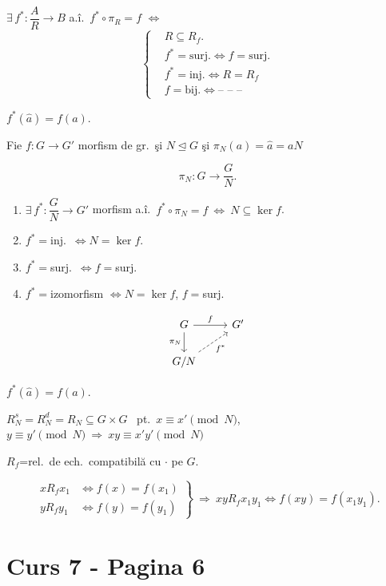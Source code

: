 \bigskip
\noindent $\exists\,f^*: \dfrac{A}{R} \to B$ a.î.\ $f^*\circ\pi_R = f$ $\Leftrightarrow$
\[
\left\{\begin{aligned}
&R\subseteq R_f.\\
&f^*=\text{surj.} \Leftrightarrow f=\text{surj.}\\
&f^*=\text{inj.} \Leftrightarrow R=R_f\\
&f=\text{bij.} \Leftrightarrow \text{-- -- --}
\end{aligned}\right.
\]

\noindent $f^*(\hat a) = f(a)$.

\bigskip
\noindent Fie $f:G\to G'$ morfism de gr.\ şi $N\trianglelefteq G$ şi $\pi_N(a) = \hat a = aN$

\[
\pi_N: G \to \dfrac{G}{N}.
\]

\begin{enumerate}
\item[(1)] $\exists\,f^*: \dfrac{G}{N}\to G'$ morfism a.î.\ $f^*\circ\pi_N = f \ \Leftrightarrow \ N\subseteq\ker f$.
\item[(2)] $f^*=$inj.\ $\Leftrightarrow N=\ker f$.
\item[(3)] $f^*=$surj.\ $\Leftrightarrow f=$surj.
\item[(4)] $f^*=$izomorfism $\Leftrightarrow N=\ker f$, $f=$surj.
\end{enumerate}

\[
\begin{tikzcd}
G \arrow[r,"f"] \arrow[d,"\pi_N"'] & G' \\
G/N \arrow[ur, dashed,"f^*"'] &
\end{tikzcd}
\]

\noindent $f^*(\hat a) = f(a)$.

\bigskip
\noindent $R_N^s = R_N^d = R_N \subseteq G\times G$ \ pt.\ $x\equiv x' \pmod N$, $y\equiv y' \pmod N \ \Rightarrow \ xy\equiv x'y' \pmod N$

\bigskip
\noindent $R_f$=rel.\ de ech.\ compatibilă cu $\cdot$ pe $G$.

\[
\left.\begin{aligned}
xR_fx_1 &\Leftrightarrow f(x)=f(x_1)\\
yR_fy_1 &\Leftrightarrow f(y)=f(y_1)
\end{aligned}\right\} \ \Rightarrow \ xyR_fx_1y_1 \Leftrightarrow f(xy)=f(x_1y_1).
\]



\section*{Curs 7 - Pagina 6}

